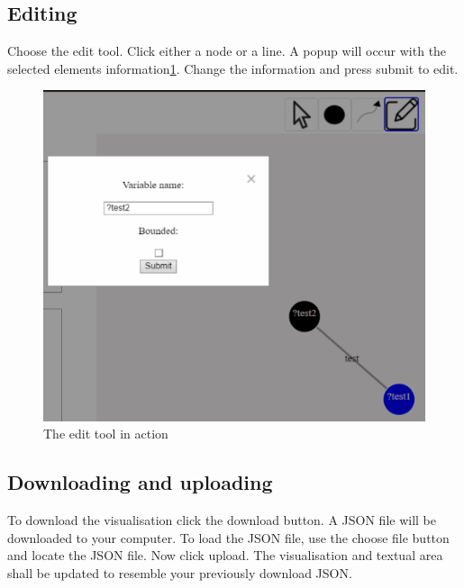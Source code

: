 \subsection{Editing}
Choose the edit tool. Click either a node or a line. A popup will occur with the selected elements information\ref{fig:user-edit}. Change the information and press submit to edit.
\begin{figure}[H]
    \centering
    \includegraphics{figures/user-edit.pdf}
    \caption{The edit tool in action}
    \label{fig:user-edit}
\end{figure}
\subsection{Downloading and uploading}
To download the visualisation click the download button. A JSON file will be downloaded to your computer. To load the JSON file, use the choose file button and locate the JSON file. Now click upload. The visualisation and textual area shall be updated to resemble your previously download JSON.
